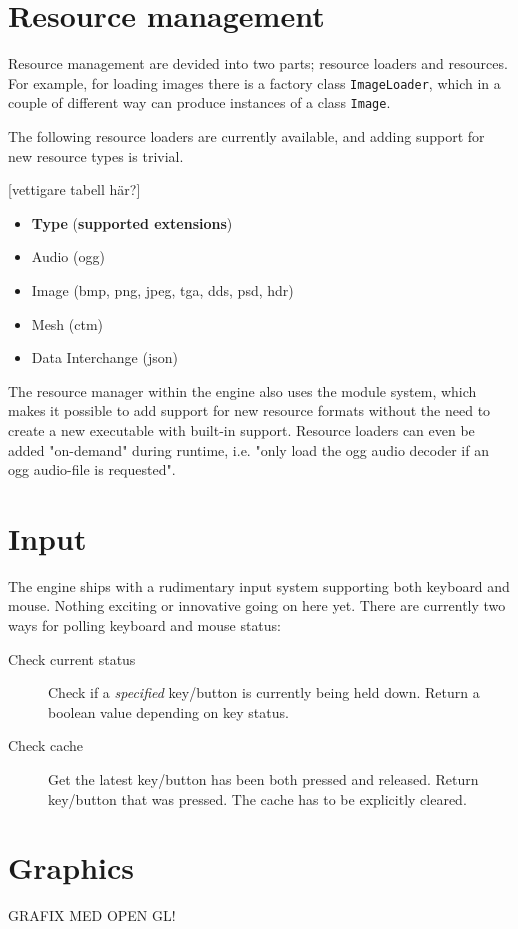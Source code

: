 \section{Resource management}
Resource management are devided into two parts; resource loaders and resources. For example, for loading images
there is a factory class \texttt{ImageLoader}, which in a couple of different way can produce instances of a class \texttt{Image}.

The following resource loaders are currently available, and adding support for new resource types is trivial.

[vettigare tabell här?]
\begin{itemize}
\item \textbf{Type} (\textbf{supported extensions})
\item Audio (ogg)
\item Image (bmp, png, jpeg, tga, dds, psd, hdr)
\item Mesh (ctm)
\item Data Interchange (json)
\end{itemize}

The resource manager within the engine also uses the module system, which makes it possible to add support for new resource formats without the need to create a new executable with built-in support. Resource loaders can even be added "on-demand" during runtime, i.e. "only load the ogg audio decoder if an ogg audio-file is requested".

\newpage

\section{Input}
The engine ships with a rudimentary input system supporting both keyboard and mouse. Nothing exciting or
innovative going on here yet. There are currently two ways for polling keyboard and mouse status:

\begin{description}
\item[Check current status] Check if a \textit{specified} key/button is currently being held down. Return a boolean value depending on key status.
\item[Check cache] Get the latest key/button has been both pressed and released. Return key/button that was pressed. The cache has to be explicitly cleared.
\end{description}
 
\section{Graphics}
GRAFIX MED OPEN GL!

